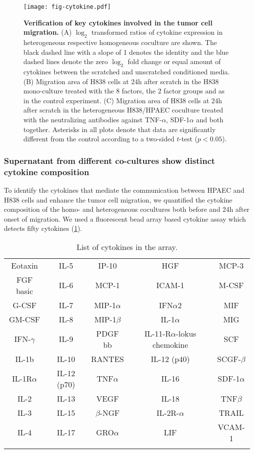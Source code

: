 \begin{figure}
\begin{center}
\texttt{[image: fig-cytokine.pdf]}
\end{center}
\caption[Verification of key cytokines]{
{\bf Verification of key cytokines involved in the tumor cell migration.} 
(A) $\log_2$ transformed ratios of cytokine expression in heterogeneous respective
homogeneous coculture are shown. The black dashed line with a slope of 1 denotes 
the identity and the blue dashed lines denote the zero $\log_2$ fold change
or equal amount of cytokines between the scratched and unscratched conditioned 
media.
(B) Migration area of H838 cells at 24h after scratch in the H838 mono-culture 
treated with the 8
factors, the 2 factor groups and as in the control experiment.
(C) Migration area of H838 cells at 24h after scratch in the heterogeneous 
H838/HPAEC coculture 
treated with the neutralizing antibodies against TNF-$\alpha$, SDF-1$\alpha$
and both together. Asterisks in all plots denote that data are significantly 
different from the control according to a two-sided $t$-test ($p < 0.05$).
}
\label{fig:cytokine}
\end{figure}

\subsubsection{Supernatant  from different co-cultures show distinct cytokine composition}

To identify the cytokines that mediate the communication between
HPAEC and H838 cells and enhance the tumor cell migration,
we quantified the cytokine composition
of the  homo- and heterogeneous cocultures
both before and 24h after onset of migration.
We used a  fluorescent bead array based cytokine assay which detects fifty cytokines (\ref{table:cytokine}).

\begin{longtable}{ccccc}
\caption{List of cytokines in the array.} \\ 
\hline
Eotaxin & IL-5 &   IP-10 &  HGF & MCP-3\\
\rowcolor{Gray} FGF basic &  IL-6 &   MCP-1 &  ICAM-1 & M-CSF\\
G-CSF &  IL-7 &   MIP-1$\alpha$ & IFN$\alpha$2 & MIF\\
\rowcolor{Gray} GM-CSF & IL-8 &   MIP-1$\beta$ &  IL-1$\alpha$ & MIG\\
IFN-$\gamma$ &  IL-9&    PDGF bb&  IL-11-R$\alpha$-lokus chemokine & SCF\\
\rowcolor{Gray} IL-1b &  IL-10 &  RANTES & IL-12 (p40) & SCGF-$\beta$\\
IL-1R$\alpha$ &  IL-12 (p70) &  TNF$\alpha$ &   IL-16 &  SDF-1$\alpha$\\
\rowcolor{Gray} IL-2 &   IL-13 &  VEGF &   IL-18 &  TNF$\beta$\\
IL-3 &   IL-15 &  $\beta$-NGF&  IL-2R-$\alpha$ &   TRAIL\\
\rowcolor{Gray} IL-4 &   IL-17 &  GRO$\alpha$ &  LIF &VCAM-1\\
\hline
\label{table:cytokine}
\end{longtable}
\newpage

